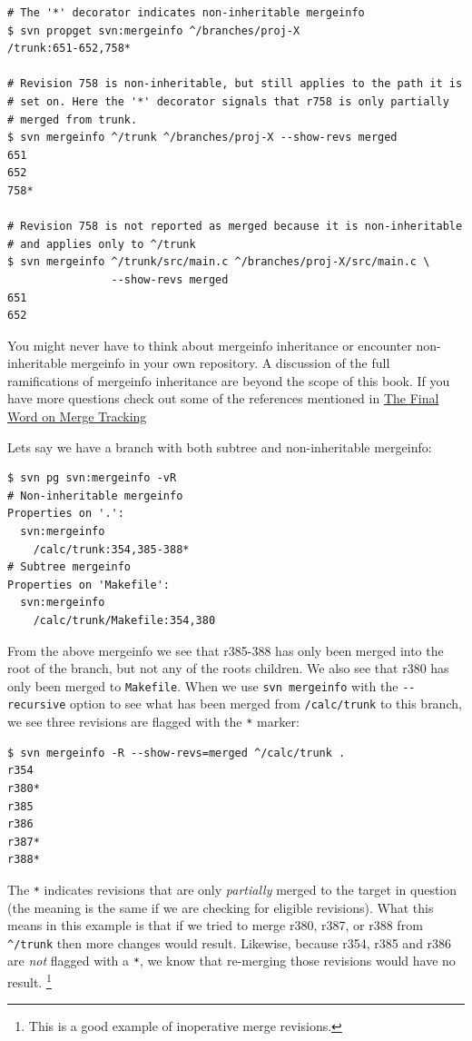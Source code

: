 \begin{verbatim}
# The '*' decorator indicates non-inheritable mergeinfo
$ svn propget svn:mergeinfo ^/branches/proj-X
/trunk:651-652,758*

# Revision 758 is non-inheritable, but still applies to the path it is
# set on. Here the '*' decorator signals that r758 is only partially
# merged from trunk. 
$ svn mergeinfo ^/trunk ^/branches/proj-X --show-revs merged
651
652
758*

# Revision 758 is not reported as merged because it is non-inheritable
# and applies only to ^/trunk
$ svn mergeinfo ^/trunk/src/main.c ^/branches/proj-X/src/main.c \
                --show-revs merged
651
652
\end{verbatim}

You might never have to think about mergeinfo inheritance or encounter
non-inheritable mergeinfo in your own repository. A discussion of the
full ramifications of mergeinfo inheritance are beyond the scope of this
book. If you have more questions check out some of the references
mentioned in \hyperref[svn.branchmerge.advanced.finalword]{The Final
Word on Merge Tracking}

Let\textquotesingle s say we have a branch with both subtree and
non-inheritable mergeinfo:

\begin{verbatim}
$ svn pg svn:mergeinfo -vR
# Non-inheritable mergeinfo
Properties on '.':
  svn:mergeinfo
    /calc/trunk:354,385-388*
# Subtree mergeinfo
Properties on 'Makefile':
  svn:mergeinfo
    /calc/trunk/Makefile:354,380
\end{verbatim}

From the above mergeinfo we see that r385-388 has only been merged into
the root of the branch, but not any of the root\textquotesingle s
children. We also see that r380 has only been merged to
\texttt{Makefile}. When we use \texttt{svn\ mergeinfo} with the
\texttt{-\/-recursive} option to see what has been merged from
\texttt{/calc/trunk} to this branch, we see three revisions are flagged
with the \texttt{*} marker:

\begin{verbatim}
$ svn mergeinfo -R --show-revs=merged ^/calc/trunk .
r354
r380*
r385
r386
r387*
r388*
\end{verbatim}

The \texttt{*} indicates revisions that are only \emph{partially} merged
to the target in question (the meaning is the same if we are checking
for eligible revisions). What this means in this example is that if we
tried to merge r380, r387, or r388 from \texttt{\^{}/trunk} then more
changes would result. Likewise, because r354, r385 and r386 are
\emph{not} flagged with a \texttt{*}, we know that re-merging those
revisions would have no result. \footnote{This is a good example of
  inoperative merge revisions.}

